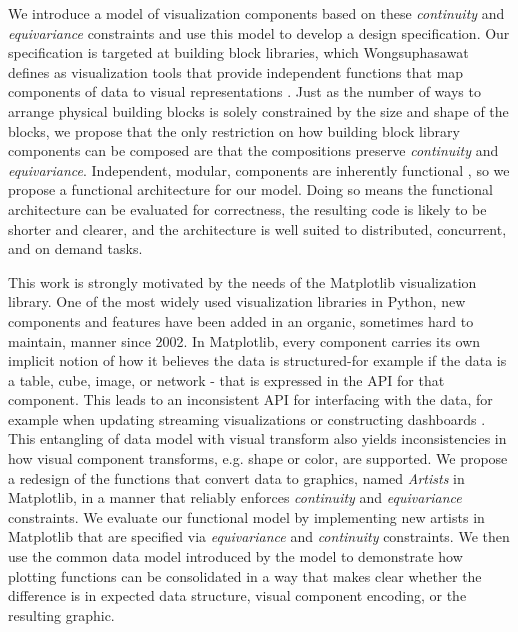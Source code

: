\documentclass[../main.tex]{subfiles}
\begin{document}
We introduce a model of visualization components based on these \textit{continuity} and \textit{equivariance} constraints and use this model to develop a design specification. Our specification is targeted at building block libraries, which Wongsuphasawat defines as visualization tools that provide independent functions that map components of data to visual representations \cite{wongsuphasawatNavigatingWideWorld2021}.  Just as the number of ways to arrange physical building blocks is solely constrained by the size and shape of the blocks, we propose that the only restriction on how building block library components can be composed are that the compositions preserve \textit{continuity} and \textit{equivariance}. Independent, modular, components are inherently functional \cite{hughesWhyFunctionalProgramming1989}, so we propose a functional architecture for our model. Doing so means the functional architecture can be evaluated for correctness, the resulting code is likely to be shorter and clearer, and the architecture is well suited to distributed, concurrent, and on demand tasks\cite{huHowFunctionalProgramming2015}.

This work is strongly motivated by the needs of the Matplotlib \cite{hunterMatplotlib2DGraphics2007,hunterArchitectureOpenSource} visualization library. One of the most widely used visualization libraries in Python, new components and features have been added in an organic, sometimes hard to maintain, manner since 2002.  In Matplotlib, every component carries its own implicit notion of how it believes the data is structured-for example if the data is a table, cube, image, or network - that is expressed in the API for that component. This leads to an inconsistent API for interfacing with the data, for example when  updating streaming visualizations or constructing dashboards  \cite{a.sarikayaWhatWeTalk2019}. This entangling of data model with visual transform also yields inconsistencies in how visual component transforms, e.g. shape or color, are supported. We propose a redesign of the functions that convert data to graphics, named \textit{Artists} in Matplotlib, in a manner that reliably enforces \textit{continuity} and \textit{equivariance} constraints. We evaluate our functional model by implementing new artists in Matplotlib that are specified via \textit{equivariance} and \textit{continuity} constraints. We then use the common data model introduced by the model to demonstrate how plotting functions can be consolidated in a way that makes clear whether the difference is in expected data structure, visual component encoding, or the resulting graphic.
\end{document}
